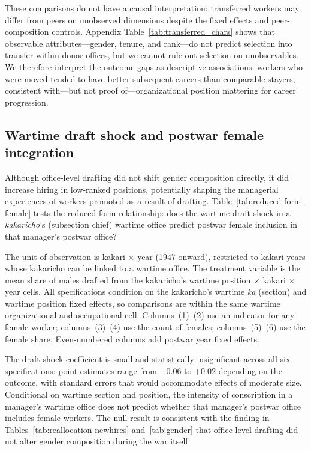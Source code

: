These comparisons do not have a causal interpretation: transferred workers may differ from peers on unobserved dimensions despite the fixed effects and peer-composition controls. Appendix Table~\ref{tab:transferred_chars} shows that observable attributes---gender, tenure, and rank---do not predict selection into transfer within donor offices, but we cannot rule out selection on unobservables. We therefore interpret the outcome gaps as descriptive associations: workers who were moved tended to have better subsequent careers than comparable stayers, consistent with---but not proof of---organizational position mattering for career progression.

\subsection{Wartime draft shock and postwar female integration}

Although office-level drafting did not shift gender composition directly, it did increase hiring in low-ranked positions, potentially shaping the managerial experiences of workers promoted as a result of drafting. Table~\ref{tab:reduced-form-female} tests the reduced-form relationship: does the wartime draft shock in a \emph{kakaricho}'s (subsection chief) wartime office predict postwar female inclusion in that manager's postwar office?

The unit of observation is kakari $\times$ year (1947 onward), restricted to kakari-years whose kakaricho can be linked to a wartime office. The treatment variable is the mean share of males drafted from the kakaricho's wartime position $\times$ kakari $\times$ year cells. All specifications condition on the kakaricho's wartime \emph{ka} (section) and wartime position fixed effects, so comparisons are within the same wartime organizational and occupational cell. Columns~(1)--(2) use an indicator for any female worker; columns~(3)--(4) use the count of females; columns~(5)--(6) use the female share. Even-numbered columns add postwar year fixed effects.

The draft shock coefficient is small and statistically insignificant across all six specifications: point estimates range from $-0.06$ to $+0.02$ depending on the outcome, with standard errors that would accommodate effects of moderate size. Conditional on wartime section and position, the intensity of conscription in a manager's wartime office does not predict whether that manager's postwar office includes female workers. The null result is consistent with the finding in Tables~\ref{tab:reallocation-newhires} and~\ref{tab:gender} that office-level drafting did not alter gender composition during the war itself.

